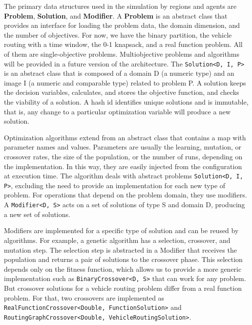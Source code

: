 \documentclass[preprint,12pt]{elsarticle}
\begin{document}
The primary data structures used in the simulation by regions and agents are \textbf{Problem}, \textbf{Solution}, and \textbf{Modifier}. A \textbf{Problem} is an abstract class that provides an interface for loading the problem data, the domain dimension, and the number of objectives. For now, we have the binary partition, the vehicle routing with a time window, the 0-1 knapsack, and a real function problem. All of them are single-objective problems. Multiobjective problems and algorithms will be provided in a future version of the architecture. The \texttt{Solution<D, I, P>} is an abstract class that is composed of a domain D (a numeric type) and an image I (a numeric and comparable type) related to problem P. A solution keeps the decision variables, calculates, and stores the objective function, and checks the viability of a solution. A hash id identifies unique solutions and is immutable, that is, any change to a particular optimization variable will produce a new solution.  

Optimization algorithms extend from an abstract class that contains a map with parameter names and values. Parameters are usually the learning, mutation, or crossover rates, the size of the population, or the number of runs, depending on the implementation. In this way, they are easily injected from the configuration at execution time. 
The algorithm deals with abstract problems \texttt{Solution<D, I, P>}, excluding the need to provide an implementation for each new type of problem. For operations that depend on the problem domain, they use modifiers. A \texttt{Modifier<D, S>} acts on a set of solutions of type S and domain D, producing a new set of solutions. 

Modifiers are implemented for a specific type of solution and can be reused by algorithms. For example, a genetic algorithm has a selection, crossover, and mutation step. The selection step is abstracted in a Modifier that receives the population and returns a pair of solutions to the crossover phase. This selection depends only on the fitness function, which allows us to provide a more generic implementation such as \texttt{BinaryCrossover<D, S>} that can work for any problem. But crossover solutions for a vehicle routing problem differ from a real function problem.  For that, two crossovers are implemented as \texttt{RealFunctionCrossover<Double, FunctionSolution>} and \texttt{RoutingGraphCrossover<Double, VehicleRoutingSolution>}.
\end{document}
